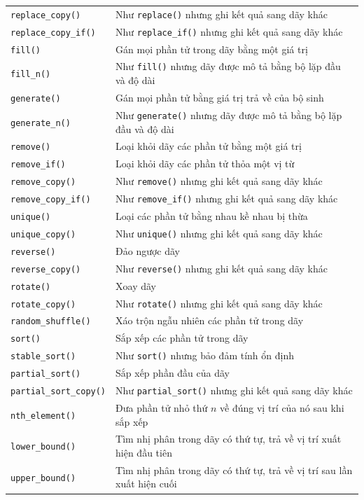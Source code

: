 \documentclass[11pt]{article}
\begin{document}
\begin{longtable}{p{}p{}}
\verb|replace_copy()| & Như \verb|replace()| nhưng ghi kết quả sang dãy khác\\
\verb|replace_copy_if()| & Như \verb|replace_if()| nhưng ghi kết quả sang dãy khác\\
\verb|fill()| & Gán mọi phần tử trong dãy bằng một giá trị\\
\verb|fill_n()| & Như \verb|fill()| nhưng dãy được mô tả bằng bộ lặp đầu và độ dài\\
\verb|generate()| & Gán mọi phần tử bằng giá trị trả về của bộ sinh\\
\verb|generate_n()| & Như \verb|generate()| nhưng dãy được mô tả bằng bộ lặp đầu và độ dài\\
\verb|remove()| & Loại khỏi dãy các phần tử bằng một giá trị\\
\verb|remove_if()| & Loại khỏi dãy các phần tử thỏa một vị từ\\
\verb|remove_copy()| & Như \verb|remove()| nhưng ghi kết quả sang dãy khác\\
\verb|remove_copy_if()| & Như \verb|remove_if()| nhưng ghi kết quả sang dãy khác\\
\verb|unique()| & Loại các phần tử bằng nhau kề nhau bị thừa\\
\verb|unique_copy()| & Như \verb|unique()| nhưng ghi kết quả sang dãy khác\\
\verb|reverse()| & Đảo ngược dãy\\
\verb|reverse_copy()| & Như \verb|reverse()| nhưng ghi kết quả sang dãy khác\\
\verb|rotate()| & Xoay dãy\\
\verb|rotate_copy()| & Như \verb|rotate()| nhưng ghi kết quả sang dãy khác\\
\verb|random_shuffle()| & Xáo trộn ngẫu nhiên các phần tử trong dãy\\
\verb|sort()| & Sắp xếp các phần tử trong dãy\\
\verb|stable_sort()| & Như \verb|sort()| nhưng bảo đảm tính ổn định\\
\verb|partial_sort()| & Sắp xếp phần đầu của dãy\\
\verb|partial_sort_copy()| & Như \verb|partial_sort()| nhưng ghi kết quả sang dãy khác\\
\verb|nth_element()| & Đưa phần tử nhỏ thứ \(n\) về đúng vị trí của nó sau khi sắp xếp\\
\verb|lower_bound()| & Tìm nhị phân trong dãy có thứ tự, trả về vị trí xuất hiện đầu tiên\\
\verb|upper_bound()| & Tìm nhị phân trong dãy có thứ tự, trả về vị trí sau lần xuất hiện cuối\\

\end{longtable}
\end{document}
